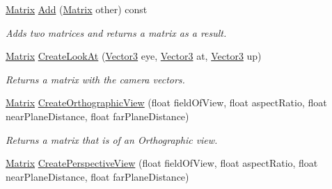 \begin{DoxyCompactItemize}
\item 
\hypertarget{struct_jade_1_1_math_1_1_matrix_aa06e1c797c397f4ef041e0f1d9e5b572}{}\hyperlink{struct_jade_1_1_math_1_1_matrix}{Matrix} \hyperlink{struct_jade_1_1_math_1_1_matrix_aa06e1c797c397f4ef041e0f1d9e5b572}{Add} (\hyperlink{struct_jade_1_1_math_1_1_matrix}{Matrix} other) const \label{struct_jade_1_1_math_1_1_matrix_aa06e1c797c397f4ef041e0f1d9e5b572}

\begin{DoxyCompactList}\small\item\em Adds two matrices and returns a matrix as a result. \end{DoxyCompactList}\item 
\hypertarget{struct_jade_1_1_math_1_1_matrix_ad463c28a746f11e6e39bce0c3c8bae7d}{}\hyperlink{struct_jade_1_1_math_1_1_matrix}{Matrix} \hyperlink{struct_jade_1_1_math_1_1_matrix_ad463c28a746f11e6e39bce0c3c8bae7d}{Create\+Look\+At} (\hyperlink{struct_jade_1_1_math_1_1_vector3}{Vector3} eye, \hyperlink{struct_jade_1_1_math_1_1_vector3}{Vector3} at, \hyperlink{struct_jade_1_1_math_1_1_vector3}{Vector3} up)\label{struct_jade_1_1_math_1_1_matrix_ad463c28a746f11e6e39bce0c3c8bae7d}

\begin{DoxyCompactList}\small\item\em Returns a matrix with the camera vectors. \end{DoxyCompactList}\item 
\hypertarget{struct_jade_1_1_math_1_1_matrix_ae3ea05edfb34a8fef4453e96c830b994}{}\hyperlink{struct_jade_1_1_math_1_1_matrix}{Matrix} \hyperlink{struct_jade_1_1_math_1_1_matrix_ae3ea05edfb34a8fef4453e96c830b994}{Create\+Orthographic\+View} (float field\+Of\+View, float aspect\+Ratio, float near\+Plane\+Distance, float far\+Plane\+Distance)\label{struct_jade_1_1_math_1_1_matrix_ae3ea05edfb34a8fef4453e96c830b994}

\begin{DoxyCompactList}\small\item\em Returns a matrix that is of an Orthographic view. \end{DoxyCompactList}\item 
\hypertarget{struct_jade_1_1_math_1_1_matrix_a2ee438ed4038bb5565050054308c80a9}{}\hyperlink{struct_jade_1_1_math_1_1_matrix}{Matrix} \hyperlink{struct_jade_1_1_math_1_1_matrix_a2ee438ed4038bb5565050054308c80a9}{Create\+Perspective\+View} (float field\+Of\+View, float aspect\+Ratio, float near\+Plane\+Distance, float far\+Plane\+Distance)\label{struct_jade_1_1_math_1_1_matrix_a2ee438ed4038bb5565050054308c80a9}


\end{DoxyCompactItemize}
